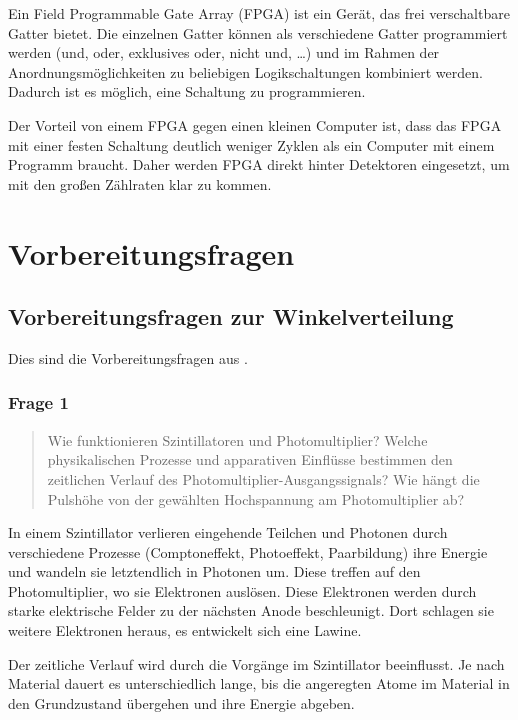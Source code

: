 \documentclass[11pt, ngerman, fleqn, DIV=15, headinclude, BCOR=2cm]{scrreprt}
\begin{document}
Ein Field Programmable Gate Array (FPGA) ist ein Gerät, das frei verschaltbare
Gatter bietet. Die einzelnen Gatter können als verschiedene Gatter programmiert
werden (und, oder, exklusives oder, nicht und, …) und im Rahmen der
Anordnungsmöglichkeiten zu beliebigen Logikschaltungen kombiniert werden.
Dadurch ist es möglich, eine Schaltung zu programmieren.

Der Vorteil von einem FPGA gegen einen kleinen Computer ist, dass das FPGA mit
einer festen Schaltung deutlich weniger Zyklen als ein Computer mit einem
Programm braucht. Daher werden FPGA direkt hinter Detektoren eingesetzt, um mit
den großen Zählraten klar zu kommen.

\section{Vorbereitungsfragen}

\subsection{Vorbereitungsfragen zur Winkelverteilung}

Dies sind die Vorbereitungsfragen aus \parencite[11]{physik512-Anleitung}.

\subsubsection{Frage 1}
\label{sec:frage1-1}

\begin{quote}
    Wie funktionieren Szintillatoren und Photomultiplier? Welche physikalischen
    Prozesse und apparativen Einflüsse bestimmen den zeitlichen Verlauf des
    Photomultiplier-Ausgangssignals? Wie hängt die Pulshöhe von der gewählten
    Hochspannung am Photomultiplier ab?
\end{quote}

In einem Szintillator verlieren eingehende Teilchen und Photonen durch
verschiedene Prozesse (Comptoneffekt, Photoeffekt, Paarbildung) ihre Energie
und wandeln sie letztendlich in Photonen um. Diese treffen auf den
Photomultiplier, wo sie Elektronen auslösen. Diese Elektronen werden durch
starke elektrische Felder zu der nächsten Anode beschleunigt. Dort schlagen sie
weitere Elektronen heraus, es entwickelt sich eine Lawine.

Der zeitliche Verlauf wird durch die Vorgänge im Szintillator beeinflusst. Je
nach Material dauert es unterschiedlich lange, bis die angeregten Atome im
Material in den Grundzustand übergehen und ihre Energie abgeben.
\end{document}
